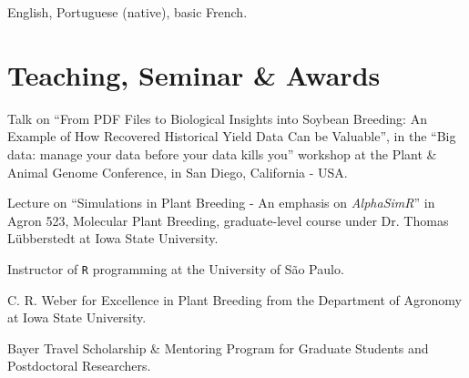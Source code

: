 \documentclass[]{mdkrause_cv_openfont}
\begin{document}
\begin{minipage}[t]{1\textwidth}
\sectionsep

English, Portuguese (native), basic French.

\sectionsep

\section{Teaching, Seminar \& Awards}

\sectionsep

\begin{tightemize}
	\item {} Talk on ``From PDF Files to Biological Insights into Soybean Breeding: An Example of How Recovered Historical Yield Data Can be Valuable'', in the ``Big data: manage your data before your data kills you'' workshop at the Plant \& Animal Genome Conference, in San Diego, California - USA.
	\item {} Lecture on ``Simulations in Plant Breeding - An emphasis on \emph{AlphaSimR}'' in Agron 523, Molecular Plant Breeding, graduate-level course under Dr. Thomas Lübberstedt at Iowa State University.
	\item {} Instructor of \texttt{R} programming at the University of São Paulo.
\end{tightemize}

\sectionsep

\begin{tightemize}
	\item {} C. R. Weber for Excellence in Plant Breeding from the Department of Agronomy at Iowa State University.
	\item {} Bayer Travel Scholarship \& Mentoring Program for Graduate Students and Postdoctoral Researchers.
\end{tightemize}

\vspace{3 mm}





\end{minipage}
\end{document}
